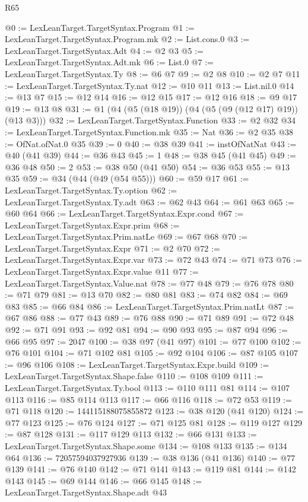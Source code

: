 \begin{lexlean}{R65}
\begin{coremodule}
@0 := LexLeanTarget.TargetSyntax.Program
@1 := LexLeanTarget.TargetSyntax.Program.mk
@2 := List.cons.{0}
@3 := LexLeanTarget.TargetSyntax.Adt
@4 := @2 @3
@5 := LexLeanTarget.TargetSyntax.Adt.mk
@6 := List.{0}
@7 := LexLeanTarget.TargetSyntax.Ty
@8 := @6 @7
@9 := @2 @8
@10 := @2 @7
@11 := LexLeanTarget.TargetSyntax.Ty.nat
@12 := @10 @11
@13 := List.nil.{0}
@14 := @13 @7
@15 := @12 @14
@16 := @12 @15
@17 := @12 @16
@18 := @9 @17
@19 := @13 @8
@31 := @1 (@4 (@5 (@18 @19)) (@4 (@5 (@9 (@12 @17) @19)) (@13 @3)))
@32 := LexLeanTarget.TargetSyntax.Function
@33 := @2 @32
@34 := LexLeanTarget.TargetSyntax.Function.mk
@35 := Nat
@36 := @2 @35
@38 := OfNat.ofNat.{0} @35
@39 := 0
@40 := @38 @39
@41 := instOfNatNat
@43 := @40 (@41 @39)
@44 := @36 @43
@45 := 1
@48 := @38 @45 (@41 @45)
@49 := @36 @48
@50 := 2
@53 := @38 @50 (@41 @50)
@54 := @36 @53
@55 := @13 @35
@59 := @34 (@44 (@49 (@54 @55)))
@60 := @59 @17
@61 := LexLeanTarget.TargetSyntax.Ty.option
@62 := LexLeanTarget.TargetSyntax.Ty.adt
@63 := @62 @43
@64 := @61 @63
@65 := @60 @64
@66 := LexLeanTarget.TargetSyntax.Expr.cond
@67 := LexLeanTarget.TargetSyntax.Expr.prim
@68 := LexLeanTarget.TargetSyntax.Prim.natLe
@69 := @67 @68
@70 := LexLeanTarget.TargetSyntax.Expr
@71 := @2 @70
@72 := LexLeanTarget.TargetSyntax.Expr.var
@73 := @72 @43
@74 := @71 @73
@76 := LexLeanTarget.TargetSyntax.Expr.value @11
@77 := LexLeanTarget.TargetSyntax.Value.nat
@78 := @77 @48
@79 := @76 @78
@80 := @71 @79
@81 := @13 @70
@82 := @80 @81
@83 := @74 @82
@84 := @69 @83
@85 := @66 @84
@86 := LexLeanTarget.TargetSyntax.Prim.natLt
@87 := @67 @86
@88 := @77 @43
@89 := @76 @88
@90 := @71 @89
@91 := @72 @48
@92 := @71 @91
@93 := @92 @81
@94 := @90 @93
@95 := @87 @94
@96 := @66 @95
@97 := 2047
@100 := @38 @97 (@41 @97)
@101 := @77 @100
@102 := @76 @101
@104 := @71 @102 @81
@105 := @92 @104
@106 := @87 @105
@107 := @96 @106
@108 := LexLeanTarget.TargetSyntax.Expr.build
@109 := LexLeanTarget.TargetSyntax.Shape.false
@110 := @108 @109
@111 := LexLeanTarget.TargetSyntax.Ty.bool
@113 := @110 @111 @81
@114 := @107 @113
@116 := @85 @114 @113
@117 := @66 @116
@118 := @72 @53
@119 := @71 @118
@120 := 144115188075855872
@123 := @38 @120 (@41 @120)
@124 := @77 @123
@125 := @76 @124
@127 := @71 @125 @81
@128 := @119 @127
@129 := @87 @128
@131 := @117 @129 @113
@132 := @66 @131
@133 := LexLeanTarget.TargetSyntax.Shape.some
@134 := @108 @133
@135 := @134 @64
@136 := 72057594037927936
@139 := @38 @136 (@41 @136)
@140 := @77 @139
@141 := @76 @140
@142 := @71 @141
@143 := @119 @81
@144 := @142 @143
@145 := @69 @144
@146 := @66 @145
@148 := LexLeanTarget.TargetSyntax.Shape.adt @43

\end{coremodule}
\end{lexlean}
